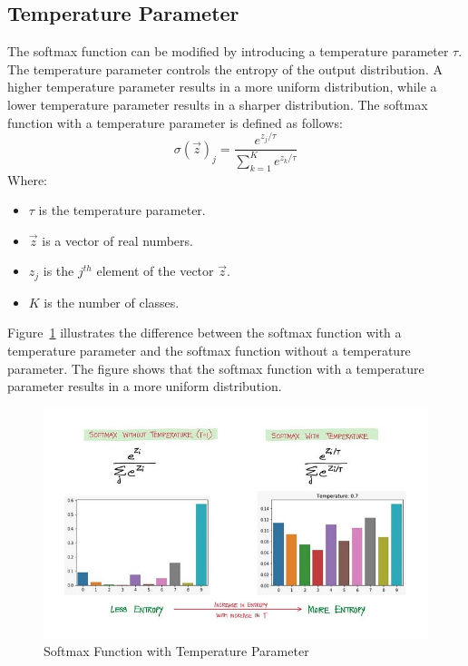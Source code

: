 \subsection{Temperature Parameter}
The softmax function can be modified by introducing a temperature parameter $\tau$. The temperature parameter controls the entropy of the output distribution. A higher temperature parameter results in a more uniform distribution, while a lower temperature parameter results in a sharper distribution. The softmax function with a temperature parameter is defined as follows:
\begin{equation}
    \sigma(\vec{z})_j = \frac{e^{z_j/\tau}}{\sum_{k=1}^{K} e^{z_k/\tau}}
\end{equation}
Where:
\begin{itemize}[noitemsep]
    \item $\tau$ is the temperature parameter.
    \item $\vec{z}$ is a vector of real numbers.
    \item $z_j$ is the $j^{th}$ element of the vector $\vec{z}$.
    \item $K$ is the number of classes.
\end{itemize}
Figure~\ref{fig:softmax_temperature} illustrates the difference between the softmax function with a temperature parameter and the softmax function without a temperature parameter. The figure shows that the softmax function with a temperature parameter results in a more uniform distribution.

\begin{figure}[H]
    \centering
    \includegraphics[width=\textwidth]{assets/0_7xj72SjtNHvCMQlV.jpg}
    \caption[Softmax Function with Temperature Parameter]{Softmax Function with Temperature Parameter ~\cite{Medium}}
    \label{fig:softmax_temperature}
\end{figure}


